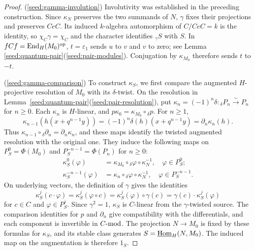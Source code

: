 \documentclass[11pt]{article}
\begin{document}
\begin{proof}
\textup{(\ref{seed:gamma-involution})} Involutivity was established in the preceding
construction. Since $\kappa_N$ preserves the two summands of $N$,
$\gamma$ fixes their projections and preserves $CeC$. Its induced
$k$-algebra automorphism of $C/CeC=k$ is the identity, so
$\chi_C\gamma=\chi_C$ and the character identifies ${}_\gamma S$
with $S$. In $fCf={\rm End}_H(M_0)^{\mathrm{op}}$, $t=\varepsilon_1$
sends $u$ to $v$ and $v$ to zero; see Lemma \ref{seed:quantum-pair}\textup{(\ref{seed:pair-modules})}.
Conjugation by $\kappa_{M_0}$ therefore sends $t$ to $-t$.

\textup{(\ref{seed:gamma-comparison})} To construct $\kappa_S$, we first compare the augmented
$H$-projective resolution of $M_0$ with its $\delta$-twist. On the
resolution in Lemma~\ref{seed:quantum-pair}\textup{(\ref{seed:pair-resolution})}, put
$\kappa_n=(-1)^n\delta:{}_\delta P_n\xrightarrow{\sim}P_n$ for $n\ge0$.
Each $\kappa_n$ is $H$-linear, and
$p\kappa_0=\kappa_{M_0}\circ{}_\delta p$. For $n\ge1$,
\[
 \kappa_{n-1}(h(x+q^{n-1}y))
   =(-1)^n\delta(h)(x+q^{n-1}y)
   =\partial_n\kappa_n(h).
\]
Thus $\kappa_{n-1}\circ{}_\delta\partial_n
=\partial_n\kappa_n$, and these maps identify the twisted
augmented resolution with the original one.
They induce the following maps on $P_S^0=\Phi(M_0)$ and
$P_S^{-n-1}=\Phi(P_n)$ for $n\ge 0$:
\begin{equation*}
 \begin{aligned}
 \kappa_S^0(\varphi)
   &=\kappa_{M_0}\circ{}_\delta\varphi\circ\kappa_N^{-1},\quad\varphi\in  P_S^0;\\
 \kappa_S^{-n-1}(\varphi)
   &=\kappa_n\circ{}_\delta\varphi\circ\kappa_N^{-1},\quad\varphi\in  P_S^{-n-1}.
 \end{aligned}
\end{equation*}
On underlying vectors, the definition of $\gamma$ gives the identities
$$\kappa_S^j(c\cdot\varphi)=\kappa_S^j(\varphi \circ c)=\kappa_S^j(\varphi)\circ\gamma(c)=\gamma(c)\cdot\kappa_S^j(\varphi)$$
for $c\in C$ and $\varphi\in P_S^j$.
Since $\gamma^2=1$, $\kappa_S$ is $C$-linear from the
$\gamma$-twisted source. The comparison identities for $p$ and
$\partial_n$ give compatibility with the differentials, and each
component is invertible in $C\mbox{{\rm -mod}}$. The projection $N\to M_0$ is
fixed by these formulas for $\kappa_S$,
and its stable class generates $S=\underline{{\rm Hom}}_H(N,M_0)$. The induced
map on the augmentation is therefore $1_S$.


\end{proof}
\end{document}
